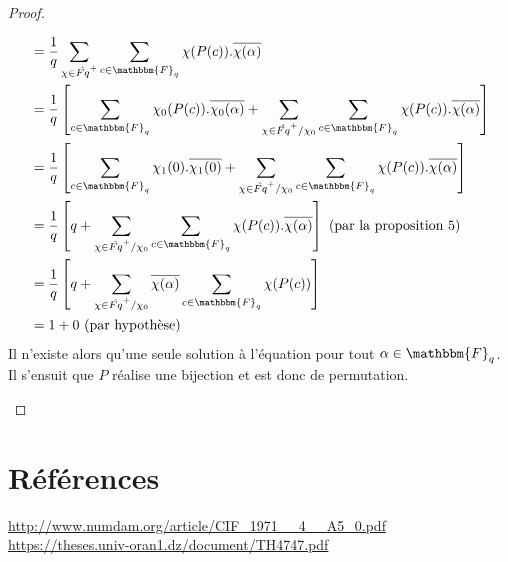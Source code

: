 \documentclass[12pt]{article}
\newcommand{\Fq}{\mathbbm{F}_q}
\theoremstyle{definition}\newtheorem{defn}{Définition}
\theoremstyle{definition}\newtheorem{exm}{Exemple}
\theoremstyle{definition}\newtheorem{rem}{Remarque}
\theoremstyle{definition}\newtheorem{algo}{Algorithme}
\theoremstyle{remark}\newtheorem{exo}{Exercice}
\theoremstyle{remark}\newtheorem{note}{Note}
\theoremstyle{remark}\newtheorem{nota}{Notation}
\begin{document}
\begin{proof}
\begin{enumerate}[label = \roman*)]
\begin{align*}
&= \displaystyle \frac{1}{q}\sum_{\chi \in \hat{Fq}^+}  \sum_{c\in\Fq}\chi(P(c)).\overline{\chi(\alpha)}\\
&= \displaystyle \frac{1}{q}\left[\sum_{c\in\Fq} \chi_0(P(c)).\overline{\chi_0(\alpha)}+\sum_{\chi \in \hat{Fq}^+/\chi_0} \sum_{c\in\Fq} \chi(P(c)).\overline{\chi(\alpha)}\right]\\
&= \displaystyle \frac{1}{q}\left[\sum_{c\in\Fq} \chi_1(0).\overline{\chi_1(0)}+\sum_{\chi \in \hat{Fq}^+/\chi_0} \sum_{c\in\Fq} \chi(P(c)).\overline{\chi(\alpha)}\right]\\
&= \displaystyle \frac{1}{q}\left[q+\sum_{\chi \in \hat{Fq}^+/\chi_0} \sum_{c\in\Fq} \chi(P(c)).\overline{\chi(\alpha)}\right]  \text{   (par la proposition 5)}\\
&= \displaystyle \frac{1}{q}\left[q+\sum_{\chi \in \hat{Fq}^+/\chi_0} \overline{\chi(\alpha)}\sum_{c\in\Fq} \chi(P(c))\right]\\
&= 1 + 0  \text{   (par hypothèse)}
\end{align*}
Il n'existe alors qu'une seule solution à l'équation pour tout $\alpha \in \Fq$. Il s'ensuit que $P$ réalise une bijection et est donc de permutation.


	\end{enumerate}
\end{proof}

\pagebreak

\section{Références}
\url{http://www.numdam.org/article/CIF_1971__4__A5_0.pdf} \\

\url{https://theses.univ-oran1.dz/document/TH4747.pdf}
\end{document}
